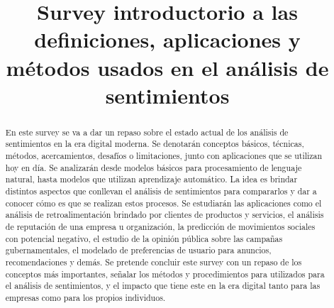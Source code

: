 \documentclass[12pt, conference]{IEEEtran}
\begin{document}
\title{Survey introductorio a las definiciones, aplicaciones y métodos usados en el análisis de sentimientos\\
}

\author{
\and
{}
\and
{}
}

\maketitle

\begin{abstract}
  En este survey se va a dar un repaso sobre el estado actual de los análisis de sentimientos en la era digital moderna. 
  Se denotarán conceptos básicos, técnicas, métodos, acercamientos, desafíos o limitaciones, junto con aplicaciones que se utilizan hoy en día. 
  Se analizarán desde modelos básicos para procesamiento de lenguaje natural, hasta modelos que utilizan aprendizaje automático. 
  La idea es brindar distintos aspectos que conllevan el análisis de sentimientos para compararlos y dar a conocer cómo es que se realizan estos procesos. 
  Se estudiarán las aplicaciones como el análisis de retroalimentación brindado por clientes de productos y servicios, el análisis de reputación de una empresa u organización, la predicción de movimientos sociales con potencial negativo, el estudio de la opinión pública sobre las campañas gubernamentales, el modelado de preferencias de usuario para anuncios, recomendaciones y demás. 
  Se pretende concluir este survey con un repaso de los conceptos más importantes, señalar los métodos y procedimientos para utilizados para el análisis de sentimientos, y el impacto que tiene este en la era digital tanto para las empresas como para los propios individuos.
\end{abstract}
\end{document}
